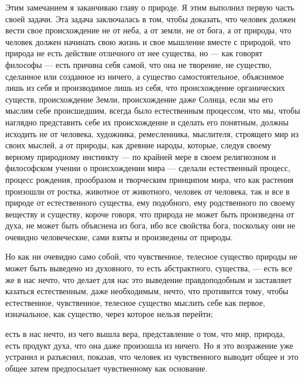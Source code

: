 \documentclass[12pt]{article}
\begin{document}
Этим замечанием я заканчиваю главу о природе. Я этим выполнил первую часть своей задачи. Эта задача заключалась в том, чтобы доказать, что человек должен вести свое происхождение не от неба, а от земли, не от бога, а от природы, что человек должен начинать свою жизнь и свое мышление вместе с природой, что природа не есть действие отличного от нее существа, но --- как говорят философы --- есть причина себя самой, что она не творение, не существо, сделанное или созданное из ничего, а существо самостоятельное, объяснимое лишь из себя и производимое лишь из себя, что происхождение органических существ, происхождение Земли, происхождение даже Солнца, если мы его мыслим себе происшедшим, всегда было естественным процессом, что мы, чтобы наглядно представить себе их происхождение и сделать его понятным, должны исходить не от человека, художника, ремесленника, мыслителя, строящего мир из своих мыслей, а от природы, как древние народы, которые, следуя своему верному природному инстинкту --- по крайней мере в своем религиозном и философском учении о происхождении мира --- сделали естественный процесс, процесс рождения, прообразом и творческим принципом мира, что как растения произошли от ростка, животное от животного, человек от человека, так и все в природе от естественного существа, ему подобного, ему родственного по своему веществу и существу, короче говоря, что природа не может быть произведена от духа, не может быть объяснена из бога, ибо все свойства бога, поскольку они не очевидно человеческие, сами взяты и произведены от природы. 

Но как ни очевидно само собой, что чувственное, телесное существо природы не может быть выведено из духовного, то есть абстрактного, существа, --- есть все же в нас нечто, что делает для нас это выведение правдоподобным и заставляет казаться естественным, даже необходимым, нечто, что противится тому, чтобы естественное, чувственное, телесное существо мыслить себе как первое, изначальное, как существо, через которое нельзя перейти; 

есть в нас нечто, из чего вышла вера, представление о том, что мир, природа, есть продукт духа, что она даже произошла из ничего. Но я это возражение уже устранил и разъяснил, показав, что человек из чувственного выводит общее и это общее затем предпосылает чувственному как основание. 
\end{document}
